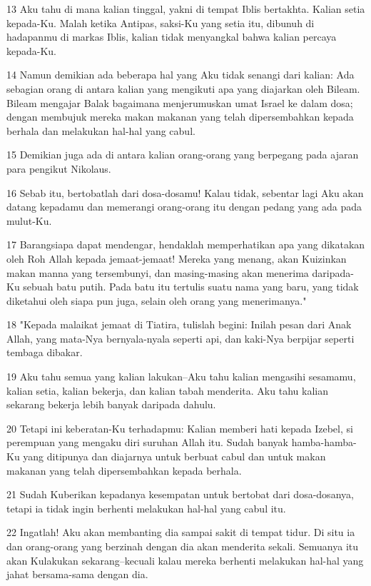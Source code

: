 \par 13 Aku tahu di mana kalian tinggal, yakni di tempat Iblis bertakhta. Kalian setia kepada-Ku. Malah ketika Antipas, saksi-Ku yang setia itu, dibunuh di hadapanmu di markas Iblis, kalian tidak menyangkal bahwa kalian percaya kepada-Ku.
\par 14 Namun demikian ada beberapa hal yang Aku tidak senangi dari kalian: Ada sebagian orang di antara kalian yang mengikuti apa yang diajarkan oleh Bileam. Bileam mengajar Balak bagaimana menjerumuskan umat Israel ke dalam dosa; dengan membujuk mereka makan makanan yang telah dipersembahkan kepada berhala dan melakukan hal-hal yang cabul.
\par 15 Demikian juga ada di antara kalian orang-orang yang berpegang pada ajaran para pengikut Nikolaus.
\par 16 Sebab itu, bertobatlah dari dosa-dosamu! Kalau tidak, sebentar lagi Aku akan datang kepadamu dan memerangi orang-orang itu dengan pedang yang ada pada mulut-Ku.
\par 17 Barangsiapa dapat mendengar, hendaklah memperhatikan apa yang dikatakan oleh Roh Allah kepada jemaat-jemaat! Mereka yang menang, akan Kuizinkan makan manna yang tersembunyi, dan masing-masing akan menerima daripada-Ku sebuah batu putih. Pada batu itu tertulis suatu nama yang baru, yang tidak diketahui oleh siapa pun juga, selain oleh orang yang menerimanya."
\par 18 "Kepada malaikat jemaat di Tiatira, tulislah begini: Inilah pesan dari Anak Allah, yang mata-Nya bernyala-nyala seperti api, dan kaki-Nya berpijar seperti tembaga dibakar.
\par 19 Aku tahu semua yang kalian lakukan--Aku tahu kalian mengasihi sesamamu, kalian setia, kalian bekerja, dan kalian tabah menderita. Aku tahu kalian sekarang bekerja lebih banyak daripada dahulu.
\par 20 Tetapi ini keberatan-Ku terhadapmu: Kalian memberi hati kepada Izebel, si perempuan yang mengaku diri suruhan Allah itu. Sudah banyak hamba-hamba-Ku yang ditipunya dan diajarnya untuk berbuat cabul dan untuk makan makanan yang telah dipersembahkan kepada berhala.
\par 21 Sudah Kuberikan kepadanya kesempatan untuk bertobat dari dosa-dosanya, tetapi ia tidak ingin berhenti melakukan hal-hal yang cabul itu.
\par 22 Ingatlah! Aku akan membanting dia sampai sakit di tempat tidur. Di situ ia dan orang-orang yang berzinah dengan dia akan menderita sekali. Semuanya itu akan Kulakukan sekarang--kecuali kalau mereka berhenti melakukan hal-hal yang jahat bersama-sama dengan dia.
